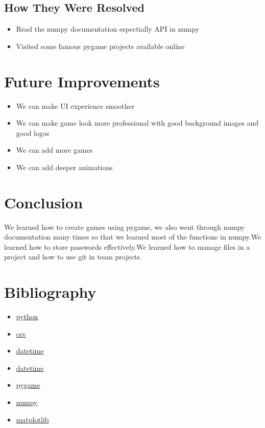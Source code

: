 \documentclass[12pt]{article}
\begin{document}
\subsection{How They Were Resolved}
\begin{itemize}
    \item Read the numpy documentation espectially API in numpy
    \item Visited some famous pygame projects available online
\end{itemize}

\section{Future Improvements }
\begin{itemize}
    \item We can make UI experience smoother
    \item We can make game look more professional with good background images and good logos
    \item We can add more games
    \item We can add deeper animations
\end{itemize}

\section{Conclusion}
We learned how to create games using pygame, we also went through numpy documentation many times so that we learned most of the functions in numpy.We learned how to store passwords effectively.We learned how to manage files in a project and how to use git in team projects.

\section{Bibliography}
\begin{itemize}
    \item \href{https://docs.python.org/3/library/index.html}{python}
    \item \href{https://docs.python.org/3/library/csv.html}{csv}
    \item \href{https://docs.python.org/3/library/datetime.html#module-datetime}{datetime}
    \item \href{https://docs.python.org/3/library/subprocess.html#module-subprocess}{datetime}
    \item \href{https://www.pygame.org/docs/}{pygame}
    \item \href{https://numpy.org/doc/2.4/}{numpy}
    \item \href{https://matplotlib.org/3.5.3/api/_as_gen/matplotlib.pyplot.html}{matplotlib}
   
\end{itemize}
\end{document}
